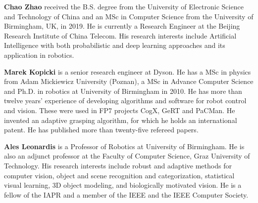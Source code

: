 \documentclass{ws-ijhr}
\begin{document}
\vspace*{13pt}  
\noindent%
\parbox{5truein}{
\begin{minipage}[b]{1truein}
\centerline{{}}
\end{minipage}
\hfill %
\begin{minipage}[b]{3.85truein}
{{\bf Chao Zhao} received the B.S. degree from the University of Electronic Science and Technology of China and an MSc in Computer Science from the University of Birmingham, UK, in 2019. He is currently a Research Engineer at the Beijing Research Institute of China Telecom. His research interests include Artificial Intelligence with both probabilistic and deep learning approaches and its application in robotics.\hfilneg}
\end{minipage}} %


\vspace*{13pt}  
\noindent%
\parbox{5truein}{
\begin{minipage}[b]{1truein}
\centerline{{}}
\end{minipage}
\hfill %
\begin{minipage}[b]{3.85truein}
{{\bf Marek Kopicki} is a senior research engineer at Dyson. He has a MSc in physics from Adam Mickiewicz University (Poznan), a MSc in Advance Computer Science and Ph.D. in robotics at University of Birmingham in 2010. He has more than twelve years’ experience of developing algorithms and software for robot control and vision. These were used in  FP7 projects CogX, GeRT and PaCMan. He invented an adaptive grasping algorithm, for which he holds an international patent. He has published more than twenty-five refereed papers.\hfilneg}
\end{minipage}} %


\vspace*{13pt}  
\noindent%
\parbox{5truein}{
\begin{minipage}[b]{1truein}
\centerline{{}}
\end{minipage}
\hfill %
\begin{minipage}[b]{3.85truein}
{{\bf Ales Leonardis} is a Professor of Robotics at University of Birmingham. He is also an adjunct professor at the Faculty of Computer Science, Graz University of Technology. His research interests include robust and adaptive methods for computer vision, object and scene recognition and categorization, statistical visual learning, 3D object modeling, and biologically motivated vision. He is a fellow of the IAPR and a member of the IEEE and the IEEE Computer Society. \hfilneg}
\end{minipage}} %
\end{document}
